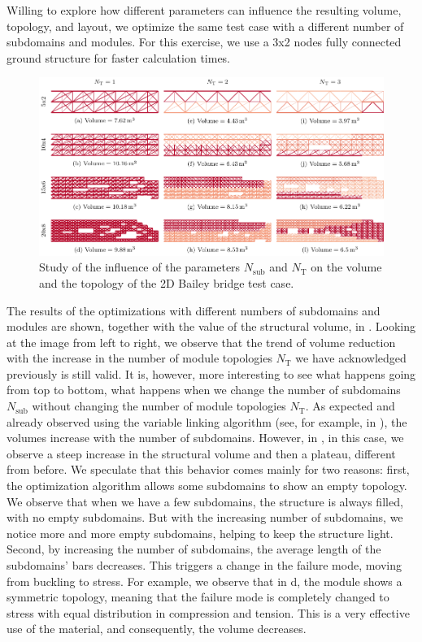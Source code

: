 Willing to explore how different parameters can influence the resulting volume, topology, and layout, we optimize the same test case with a different number of subdomains and modules. For this exercise, we use a 3x2 nodes fully connected ground structure for faster calculation times.

\begin{figure}
    \centering
    \includegraphics{figures/06_DMO/00_tug_bench_size/size.pdf}
    \caption{Study of the influence of the parameters $N_\text{sub}$ and $N_\text{T}$ on the volume and the topology of the 2D Bailey bridge test case.}
    \label{fig:06_size_res}
\end{figure}

The results of the optimizations with different numbers of subdomains and modules are shown, together with the value of the structural volume, in . Looking at the image from left to right, we observe that the trend of volume reduction with the increase in the number of module topologies $N_\text{T}$ we have acknowledged previously is still valid. It is, however, more interesting to see what happens going from top to bottom, \ie what happens when we change the number of subdomains $N_\text{sub}$ without changing the number of module topologies $N_\text{T}$. As expected and already observed using the variable linking algorithm (see, for example,  in ), the volumes increase with the number of subdomains. However, in , in this case, we observe a steep increase in the structural volume and then a plateau, different from before. We speculate that this behavior comes mainly for two reasons: first, the optimization algorithm allows some subdomains to show an empty topology. We observe that when we have a few subdomains, the structure is always filled, with no empty subdomains. But with the increasing number of subdomains, we notice more and more empty subdomains, helping to keep the structure light. Second, by increasing the number of subdomains, the average length of the subdomains' bars decreases. This triggers a change in the failure mode, moving from buckling to stress. For example, we observe that in d, the module shows a symmetric topology, meaning that the failure mode is completely changed to stress with equal distribution in compression and tension. This is a very effective use of the material, and consequently, the volume decreases.

